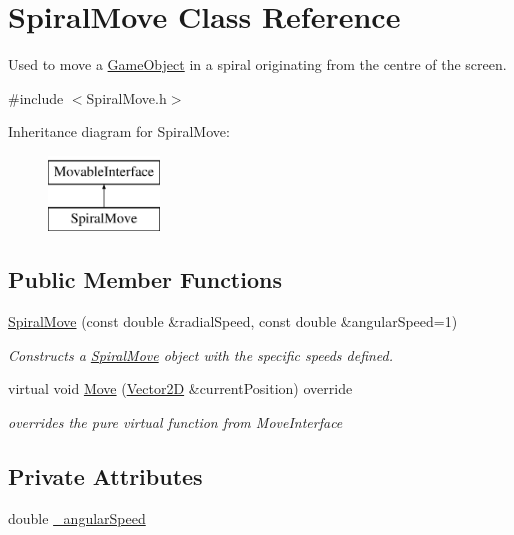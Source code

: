 \hypertarget{class_spiral_move}{}\section{Spiral\+Move Class Reference}
\label{class_spiral_move}


Used to move a \hyperlink{class_game_object}{Game\+Object} in a spiral originating from the centre of the screen.  




{\ttfamily \#include $<$Spiral\+Move.\+h$>$}

Inheritance diagram for Spiral\+Move\+:\begin{figure}[H]
\begin{center}
\leavevmode
\includegraphics[height=2.000000cm]{d5/dcf/class_spiral_move}
\end{center}
\end{figure}
\subsection*{Public Member Functions}
\begin{DoxyCompactItemize}
\item 
\hyperlink{class_spiral_move_ac66bcfdc562914510243832d4762f148}{Spiral\+Move} (const double \&radial\+Speed, const double \&angular\+Speed=1)
\begin{DoxyCompactList}\small\item\em Constructs a \hyperlink{class_spiral_move}{Spiral\+Move} object with the specific speeds defined. \end{DoxyCompactList}\item 
virtual void \hyperlink{class_spiral_move_a74b22995f5f3c00c623ecaa3adb2ab8e}{Move} (\hyperlink{class_vector2_d}{Vector2D} \&current\+Position) override
\begin{DoxyCompactList}\small\item\em overrides the pure virtual function from Move\+Interface \end{DoxyCompactList}\end{DoxyCompactItemize}
\subsection*{Private Attributes}
\begin{DoxyCompactItemize}
\item 
double \hyperlink{class_spiral_move_a50cae711a780fdf56fffcb279df63f37}{\+\_\+angular\+Speed}
\end{DoxyCompactItemize}

